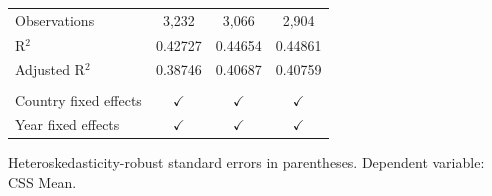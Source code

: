 \begin{table}[htbp]
\begin{tabular}{lccc}
       \\
      Observations          & 3,232          & 3,066         & 2,904\\  
      R$^2$                 & 0.42727        & 0.44654       & 0.44861\\  
      Adjusted R$^2$        & 0.38746        & 0.40687       & 0.40759\\  
       \\
      Country fixed effects & $\checkmark$   & $\checkmark$  & $\checkmark$\\   
      Year fixed effects    & $\checkmark$   & $\checkmark$  & $\checkmark$\\   
      \bottomrule
   \end{tabular}
   
   \par \raggedright 
   Heteroskedasticity-robust standard errors in parentheses. Dependent variable: CSS Mean.
\end{table}



